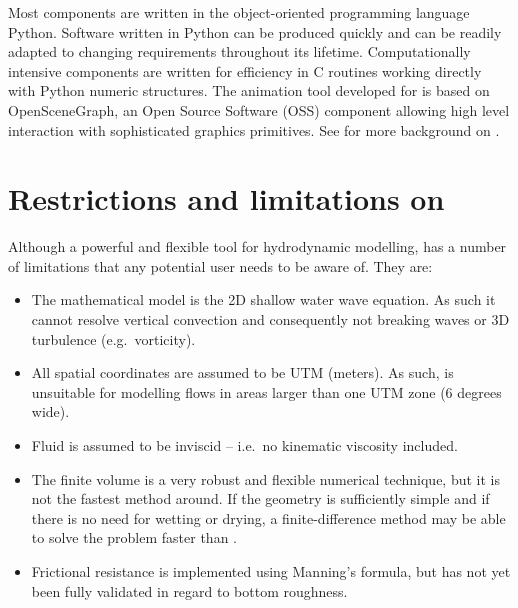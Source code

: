 \documentclass{manual}
\begin{document}
Most \anuga components are written in the object-oriented programming
language Python.  Software written in Python can be produced quickly
and can be readily adapted to changing requirements throughout its
lifetime.  Computationally intensive components are written for
efficiency in C routines working directly with Python numeric
structures.  The animation tool developed for \anuga is based on
OpenSceneGraph, an Open Source Software (OSS) component allowing high
level interaction with sophisticated graphics primitives.
See \cite{nielsen2005} for more background on \anuga.

\chapter{Restrictions and limitations on \anuga}
\label{ch:limitations}

Although a powerful and flexible tool for hydrodynamic modelling, \anuga has a
number of limitations that any potential user needs to be aware of. They are:

\begin{itemize}
  \item The mathematical model is the 2D shallow water wave equation.
  As such it cannot resolve vertical convection and consequently not breaking
  waves or 3D turbulence (e.g.\ vorticity).
  \item All spatial coordinates are assumed to be UTM (meters). As such,
  \anuga is unsuitable for modelling flows in areas larger than one UTM zone
  (6 degrees wide).
  \item Fluid is assumed to be inviscid -- i.e.\ no kinematic viscosity included.
  \item The finite volume is a very robust and flexible numerical technique,
  but it is not the fastest method around. If the geometry is sufficiently
  simple and if there is no need for wetting or drying, a finite-difference
  method may be able to solve the problem faster than \anuga.
  \item Frictional resistance is implemented using Manning's formula, but
  \anuga has not yet been fully validated in regard to bottom roughness.
\end{itemize}
\end{document}
